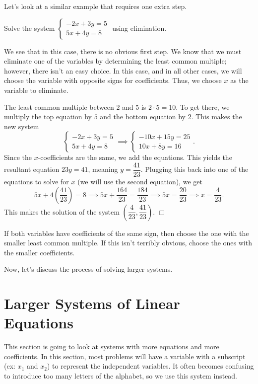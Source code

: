 \documentclass[lang=en,11pt]{elegantbook}
\begin{document}
Let's look at a similar example that requires one extra step.
\begin{example}
Solve the system $\begin{cases} -2x+3y=5 \\ 5x+4y=8\end{cases}$ using elimination.
\end{example}
\begin{solution}
We see that in this case, there is no obvious first step.  We know that we must eliminate one of the variables by determining the least common multiple; however, there isn't an easy choice.  In this case, and in all other cases, we will choose the variable with opposite signs for coefficients.  Thus, we choose $x$ as the variable to eliminate.  

The least common multiple between $2$ and $5$ is $2\cdot 5=10$.  To get there, we multiply the top equation by $5$ and the bottom equation by $2$.  This makes the new system $$\begin{cases} -2x+3y=5 \\ 5x+4y=8\end{cases}\implies \begin{cases} -10x+15y=25 \\ 10x+8y=16 \end{cases}.$$  Since the $x$-coefficients are the same, we add the equations.  This yields the resultant equation $23y=41$, meaning $y=\dfrac{41}{23}.$  Plugging this back into one of the equations to solve for $x$ (we will use the second equation), we get $$5x+4\left(\dfrac{41}{23}\right)=8 \implies 5x+\dfrac{164}{23}=\dfrac{184}{23} \implies 5x=\dfrac{20}{23}\implies x=\dfrac{4}{23}.$$  This makes the solution of the system $\left(\dfrac{4}{23},\dfrac{41}{23}\right)$.  $\Box$
\end{solution}

\begin{remark}
If both variables have coefficients of the same sign, then choose the one with the smaller least common multiple.  If this isn't terribly obvious, choose the ones with the smaller coefficients.
\end{remark}

Now, let's discuss the process of solving larger systems.
\section{Larger Systems of Linear Equations}
\noindent This section is going to look at systems with more equations and more coefficients.  In this section, most problems will have a variable with a subscript (ex: $x_1$ and $x_2$) to represent the independent variables.  It often becomes confusing to introduce too many letters of the alphabet, so we use this system instead.
\end{document}
